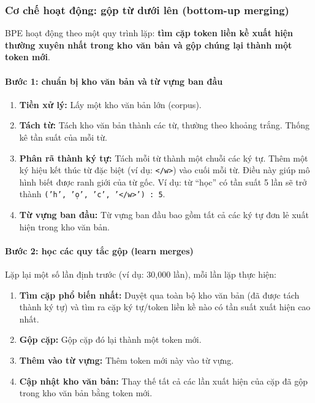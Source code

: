 \subsubsection{Cơ chế hoạt động: gộp từ dưới lên (bottom-up merging)}
BPE hoạt động theo một quy trình lặp: \textbf{tìm cặp token liền kề xuất hiện thường xuyên nhất trong kho văn bản và gộp chúng lại thành một token mới}.

\paragraph{Bước 1: chuẩn bị kho văn bản và từ vựng ban đầu}
\begin{enumerate}
    \item \textbf{Tiền xử lý:} Lấy một kho văn bản lớn (corpus).
    \item \textbf{Tách từ:} Tách kho văn bản thành các từ, thường theo khoảng trắng. Thống kê tần suất của mỗi từ.
    \item \textbf{Phân rã thành ký tự:} Tách mỗi từ thành một chuỗi các ký tự. Thêm một ký hiệu kết thúc từ đặc biệt (ví dụ: \texttt{</w>}) vào cuối mỗi từ. Điều này giúp mô hình biết được ranh giới của từ gốc. Ví dụ: từ “học” có tần suất 5 lần sẽ trở thành \texttt{('h', 'ọ', 'c', '</w>') : 5}.
    \item \textbf{Từ vựng ban đầu:} Từ vựng ban đầu bao gồm tất cả các ký tự đơn lẻ xuất hiện trong kho văn bản.
\end{enumerate}

\paragraph{Bước 2: học các quy tắc gộp (learn merges)}
Lặp lại một số lần định trước (ví dụ: 30,000 lần), mỗi lần lặp thực hiện:
\begin{enumerate}
    \item \textbf{Tìm cặp phổ biến nhất:} Duyệt qua toàn bộ kho văn bản (đã được tách thành ký tự) và tìm ra cặp ký tự/token liền kề nào có tần suất xuất hiện cao nhất.
    \item \textbf{Gộp cặp:} Gộp cặp đó lại thành một token mới.
    \item \textbf{Thêm vào từ vựng:} Thêm token mới này vào từ vựng.
    \item \textbf{Cập nhật kho văn bản:} Thay thế tất cả các lần xuất hiện của cặp đã gộp trong kho văn bản bằng token mới.
\end{enumerate}

